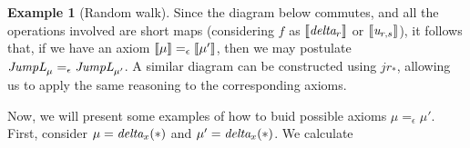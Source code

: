 \documentclass[10pt,a4paper]{amsart}
\theoremstyle{definition}
\theoremstyle{definition}
\newtheorem{example}[definition]{Example}
\theoremstyle{definition}
\theoremstyle{definition}
\theoremstyle{definition}
\theoremstyle{definition}
\begin{document}
\begin{example}[Random walk]
\begin{comment}
    Where $i_2:  \mathcal{M}\mathbb{R} \,   \widehat{\otimes}_{\pi} \,   \mathcal{M}\mathbb{R} \to  \mathcal{M} \left( \mathbb{R} \times \mathbb{R} \right) $ is an isomorphism defined as $i_{2}( \mu  \widehat{\otimes}_{\pi} \nu ) = \mu \otimes \nu $ 
    and the function $f: \mathcal{M}\mathbb{R} \times \mathcal{M}\mathbb{R}  \to \mathcal{M} \left( \mathbb{R} \times \mathbb{R} \right) $ is defined as $f((\mu, \nu)) = \mu \otimes \nu $. 
    The product measure $\mu \otimes \nu$ is defined as $\mu \otimes \nu (A \times B)= \mu(A)\cdot\nu(B).$
      This is the measure produced by the Carath\'{e}odory's extension theorem \cite{aliprantisBanachLattices1999}.
       Given that $\norm{\mu \otimes \nu}= \norm{\mu} \cdot \norm{\nu}$,  and $\norm{(\mu, \nu)}= \max\{\norm{\mu}, \norm{\nu}\}$, for $\norm{\mu} \leq 1$ and $\norm{\nu} \leq 1$, it follows that $f$ is a short map.

    \end{comment}

    Since the diagram below commutes, and all the operations involved are short maps (considering $f$ as $\left \llbracket \emph{delta}_r \right \rrbracket$ or $\left \llbracket \emph{u}_{r,s} \right \rrbracket$), it follows that, if we have an axiom \(\left \llbracket \mu \right \rrbracket =_{\epsilon} \left \llbracket \mu' \right \rrbracket\), then we may postulate \(\emph{JumpL}_\mu =_{\epsilon} \emph{JumpL}_{\mu'}\). A similar diagram can be constructed using \(jr_{*}\), allowing us to apply the same reasoning to the corresponding axioms.


    Now, we will present some examples of how to buid possible axioms \(\mu =_{\epsilon} \mu'\).
    First, consider $\mu=\emph{delta}_x(*)$ and  $\mu'=\emph{delta}_x(*)$. We calculate


\end{example}
\end{document}
